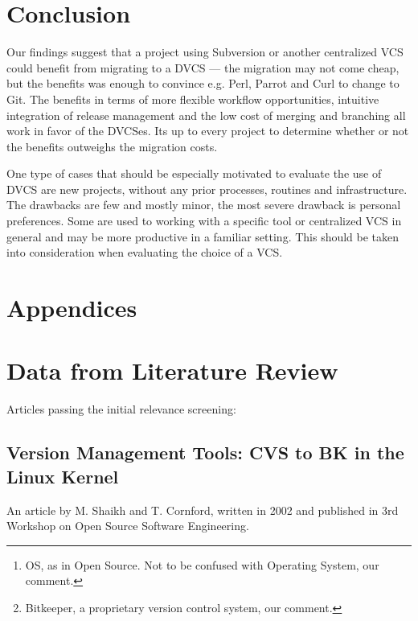 \documentclass{llncs}
\begin{document}
\section{Conclusion}

Our findings suggest that a project using Subversion or another
centralized VCS could benefit from migrating to a DVCS --- the
migration may not come cheap, but the benefits was enough to convince
e.g. Perl, Parrot and Curl to change to Git. The benefits in terms of
more flexible workflow opportunities, intuitive integration of release
management and the low cost of merging and branching all work in favor
of the DVCSes. Its up to every project to determine whether or not the
benefits outweighs the migration costs.

One type of cases that should be especially motivated to evaluate the
use of DVCS are new projects, without any prior processes, routines
and infrastructure. The drawbacks are few and mostly minor, the most
severe drawback is personal preferences. Some are used to working with
a specific tool or centralized VCS in general and may be more
productive in a familiar setting. This should be taken into
consideration when evaluating the choice of a VCS.

 


\newpage
\section*{Appendices}
\appendix
\section{Data from Literature Review}

Articles passing the initial relevance screening:

\subsection{Version Management Tools: CVS to BK in the Linux Kernel}

An article by M. Shaikh and T. Cornford, written in 2002 and published 
in 3rd Workshop on Open Source Software Engineering.

\begin{abstract}
 Version management tools might be seen as a prerequisite for open
 source development today as projects become too large to be managed by
 maintainers alone. Yet the OS\footnote{ 
  OS, as in Open Source. Not to be confused with Operating System, our 
  comment.
 } process depends on fluid coordination and collaboration with the
 underlying qualities of this process based on firm trust and
 respect for fellow developers. This paper is a study of how
 debate over version tools reflects governance and decision making
 in an OS community. The paper is based on a study of the Linux kernel
 community as it first saw a partial acceptance of the CVS tool, and then
 later adopted BK\footnote{
  Bitkeeper, a proprietary version control system, our comment. 
 }. The paper explains the adoption process in relation to governance
 concerns, license issues, and questions of technical performance.
\end{abstract}
\end{document}
